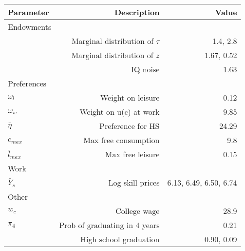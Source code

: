 \begin{tabular}{lrr}
\hline
Parameter & Description  & Value  \\ 
\hline
Endowments &   &   \\ 
 & Marginal distribution of $\tau$  & 1.4, 2.8  \\ 
 & Marginal distribution of $z$  & 1.67, 0.52  \\ 
 & IQ noise  & 1.63  \\ 
Preferences &   &   \\ 
$\omega_{l}$ & Weight on leisure  & 0.12  \\ 
$\omega_{w}$ & Weight on u(c) at work  & 9.85  \\ 
$\bar{\eta}$ & Preference for HS  & 24.29  \\ 
$\bar{c}_{max}$ & Max free consumption  & 9.8  \\ 
$\bar{l}_{max}$ & Max free leisure  & 0.15  \\ 
Work &   &   \\ 
$\bar{Y}_{s}$ & Log skill prices  & 6.13, 6.49, 6.50, 6.74  \\ 
Other &   &   \\ 
$w_{c}$ & College wage  & 28.9  \\ 
$\pi_{4}$ & Prob of graduating in 4 years  & 0.21  \\ 
 & High school graduation  & 0.90, 0.09  \\ 
\hline
\end{tabular}%
